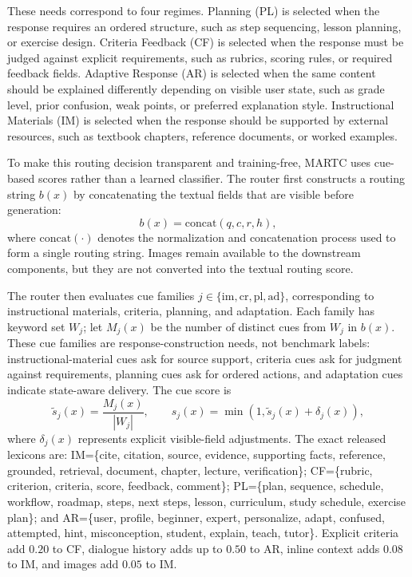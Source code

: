 \documentclass[letterpaper, 10 pt, conference]{ieeeconf}
\begin{document}
These needs correspond to four regimes. Planning (PL) is selected when the response requires an ordered structure, such as step sequencing, lesson planning, or exercise design. Criteria Feedback (CF) is selected when the response must be judged against explicit requirements, such as rubrics, scoring rules, or required feedback fields. Adaptive Response (AR) is selected when the same content should be explained differently depending on visible user state, such as grade level, prior confusion, weak points, or preferred explanation style. Instructional Materials (IM) is selected when the response should be supported by external resources, such as textbook chapters, reference documents, or worked examples.

To make this routing decision transparent and training-free, MARTC uses cue-based scores rather than a learned classifier. The router first constructs a routing string $b(x)$ by concatenating the textual fields that are visible before generation:
\begin{equation}
b(x)=\mathrm{concat}(q,c,r,h),
\end{equation}
where $\mathrm{concat}(\cdot)$ denotes the normalization and concatenation process used to form a single routing string. Images remain available to the downstream components, but they are not converted into the textual routing score.

The router then evaluates cue families $j\in\{\mathrm{im},\mathrm{cr},\mathrm{pl},\mathrm{ad}\}$, corresponding to instructional materials, criteria, planning, and adaptation. Each family has keyword set $W_j$; let $M_j(x)$ be the number of distinct cues from $W_j$ in $b(x)$. These cue families are response-construction needs, not benchmark labels: instructional-material cues ask for source support, criteria cues ask for judgment against requirements, planning cues ask for ordered actions, and adaptation cues indicate state-aware delivery. The cue score is
\begin{equation}
\widetilde{s}_j(x)=\frac{M_j(x)}{|W_j|},\qquad
s_j(x)=\min\left(1,\widetilde{s}_j(x)+\delta_j(x)\right),
\end{equation}
where $\delta_j(x)$ represents explicit visible-field adjustments. The exact released lexicons are: IM=\{cite, citation, source, evidence, supporting facts, reference, grounded, retrieval, document, chapter, lecture, verification\}; CF=\{rubric, criterion, criteria, score, feedback, comment\}; PL=\{plan, sequence, schedule, workflow, roadmap, steps, next steps, lesson, curriculum, study schedule, exercise plan\}; and AR=\{user, profile, beginner, expert, personalize, adapt, confused, attempted, hint, misconception, student, explain, teach, tutor\}. Explicit criteria add $0.20$ to CF, dialogue history adds up to $0.50$ to AR, inline context adds $0.08$ to IM, and images add $0.05$ to IM.
\end{document}

